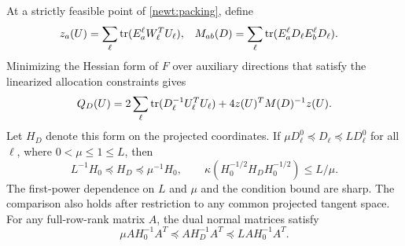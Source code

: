 \begin{theorem}
\label{newt:linear}
At a strictly feasible point of \eqref{newt:packing}, define
\begin{align}
 z_a(U)&=\sum_\ell\operatorname{tr}(E_a^\ell W_\ell^TU_\ell),
 &M_{ab}(D)&=\sum_\ell\operatorname{tr}(E_a^\ell D_\ell E_b^\ell D_\ell).
       \label{newt:z-m}
\end{align}
Minimizing the Hessian form of $F$ over auxiliary directions that
satisfy the linearized allocation constraints gives
\begin{equation}\label{newt:quotient}
 Q_D(U)=2\sum_\ell\operatorname{tr}(D_\ell^{-1}U_\ell^TU_\ell)
                 +4z(U)^TM(D)^{-1}z(U).
\end{equation}
Let $H_D$ denote this form on the projected coordinates.  If
$\mu D_\ell^0\preceq D_\ell\preceq L D_\ell^0$ for all $\ell$,
where $0<\mu\leq1\leq L$, then
\begin{equation}\label{newt:linear-transfer}
 L^{-1}H_0\preceq H_D\preceq\mu^{-1}H_0,
 \qquad
 \kappa(H_0^{-1/2}H_DH_0^{-1/2})\leq L/\mu.
\end{equation}
The first-power dependence on $L$ and $\mu$ and the condition bound
are sharp.  The comparison also holds after restriction to any common
projected tangent space.  For any
full-row-rank matrix $A$, the dual normal matrices satisfy
\begin{equation}\label{newt:dual-transfer}
 \mu AH_0^{-1}A^T\preceq AH_D^{-1}A^T
                         \preceq L AH_0^{-1}A^T.
\end{equation}
\end{theorem}
